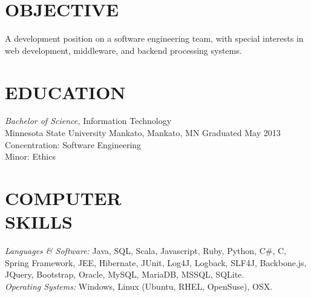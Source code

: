 \documentclass[line,margin]{res}
\begin{document}
\address{151 8th Avenue South Apt\# 304, Hopkins, MN 55343}
\address{
    \Mobilefone \hspace{1 pt} (651)-285-4565 | 
    \Letter \hspace{1 pt} \href{mailto:drew@sothr.com?subject=Concerning Your Resume}{drew@sothr.com} | 
    \Mundus \hspace{1 pt} \url{http://www.sothr.com}
}

\begin{resume}

\section{OBJECTIVE} A development position on a software engineering team, with special 
                interests in web development, middleware, and backend processing systems. 

\section{EDUCATION} {\sl Bachelor of Science,} Information Technology \\
                Minnesota State University Mankato, Mankato, MN 
                Graduated May 2013 \\
                Concentration: Software Engineering \\
                Minor: Ethics 

\section{COMPUTER \\ SKILLS} {\sl Languages \& Software:} Java, SQL, Scala, Javascript, 
         Ruby, Python, C\#, C, Spring Framework, JEE, 
                Hibernate, JUnit, Log4J, Logback, SLF4J, 
                Backbone.js, JQuery, Bootstrap, 
                Oracle, MySQL, MariaDB, MSSQL, SQLite. \\
                {\sl Operating Systems:} Windows, Linux (Ubuntu, RHEL, OpenSuse), OSX.


\end{resume}
\end{document}
